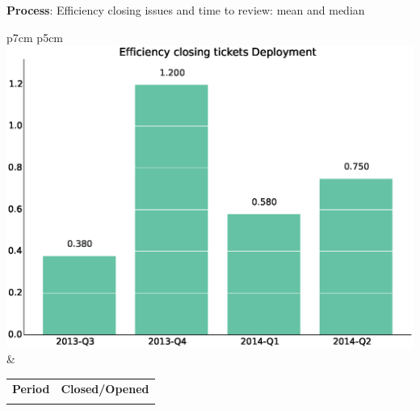 \documentclass[a4wide,11pt]{report}
\begin{document}
\textbf{Process}: Efficiency closing issues and time to review: mean and median

\begin{tabular}{p{7cm} p{5cm}}
    \vspace{0pt} 
    \includegraphics[scale=.35]{figs/bmiDeployment.eps}
    & 
    \vspace{0pt}
    \begin{tabular}{l|l}%
    \bfseries Period & \bfseries Closed/Opened %
    \csvreader[head to column names]{data/bmiDeployment.csv}{}%
    {\\ & \bmi}
    \end{tabular}
\end{tabular}
\end{document}
